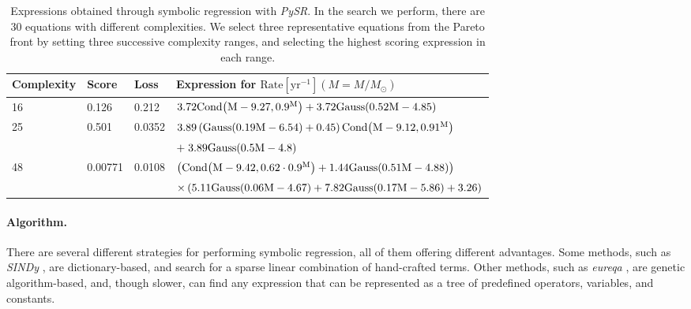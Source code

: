 \documentclass[nohyperref]{article}
\newcommand\pysr{\textit{PySR}\xspace}
\theoremstyle{plain}
\theoremstyle{definition}
\theoremstyle{remark}
\begin{document}
\begin{table*}[hbt!]
    \begin{center}
    \begin{tabular}{ l l l l }
    \hline
    \hline
    Complexity &  Score & Loss & Expression for $\text{Rate}[\text{yr}^{-1}](M=M/M_\odot)$\\
    \hline
    \hline
    16 & 0.126   & 0.212  & $3.72 \rm{Cond}{\left(M - 9.27,0.9^{M} \right)} + 3.72 \rm{Gauss}{\left(0.52 M - 4.85 \right)}$\\[0.4em]
    25 & 0.501   & 0.0352 & $3.89 \left(\rm{Gauss}{\left(0.19 M - 6.54 \right)} + 0.45\right) \rm{Cond}{\left(M - 9.12,0.91^{M} \right)}$\\
    & & & $ +\; 3.89 \rm{Gauss}{\left(0.5 M - 4.8 \right)}$\\[0.4em]
    48 & 0.00771 & 0.0108 & $\left(\rm{Cond}{\left(M - 9.42,0.62 \cdot 0.9^{M} \right)} + 1.44 \rm{Gauss}{\left(0.51 M - 4.88 \right)}\right)$\\
    & & & $\times\left(5.11 \rm{Gauss}{\left(0.06 M - 4.67 \right)} + 7.82 \rm{Gauss}{\left(0.17 M - 5.86 \right)} + 3.26\right)$\\
    \hline
    \hline
    \end{tabular}
    \caption{Expressions obtained through symbolic regression with \pysr.
    In the search we perform, there are 30 equations with different complexities.
    We select three representative equations from the Pareto front by setting three successive complexity ranges, and selecting the highest scoring expression in each range.}
    \label{tab:equations}
    \end{center}
\end{table*}

\paragraph{Algorithm.}
There are several different strategies for performing symbolic regression, all of them offering different advantages.
Some methods, such as \textit{SINDy} \cite{bruntonDiscoveringGoverningEquations2016}, are dictionary-based, and search for a sparse linear combination of hand-crafted terms.
Other methods, such as \textit{eureqa} \cite{schmidtDistillingFreeFormNatural2009}, are genetic algorithm-based, and, though slower, can find any expression that can be represented as a tree of predefined operators, variables, and constants.
\end{document}
